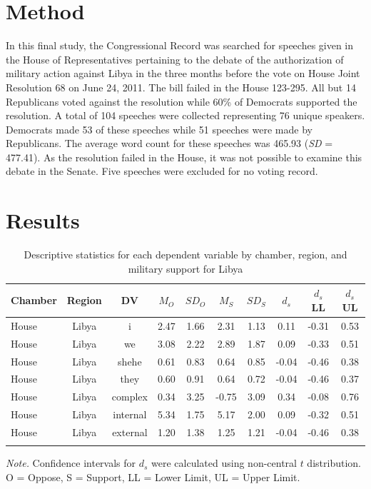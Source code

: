 \documentclass[english,,man,floatsintext]{apa6}
\begin{document}
\hypertarget{method-5}{%
\section{Method}\label{method-5}}

In this final study, the Congressional Record was searched for speeches given in the House of Representatives pertaining to the debate of the authorization of military action against Libya in the three months before the vote on House Joint Resolution 68 on June 24, 2011. The bill failed in the House 123-295. All but 14 Republicans voted against the resolution while 60\% of Democrats supported the resolution. A total of 104 speeches were collected representing 76 unique speakers. Democrats made 53 of these speeches while 51 speeches were made by Republicans. The average word count for these speeches was 465.93 (\emph{SD} = 477.41). As the resolution failed in the House, it was not possible to examine this debate in the Senate. Five speeches were excluded for no voting record.

\hypertarget{results-4}{%
\section{Results}\label{results-4}}

\begin{table}[tbp]
\begin{center}
\begin{threeparttable}
\caption{\label{tab:Ltable}Descriptive statistics for each dependent variable by chamber, 
          region, and military support for Libya}
\small{
\begin{tabular}{lccccccccc}
\toprule
Chamber & Region & DV & $M_O$ & $SD_O$ & $M_S$ & $SD_S$ & $d_s$ & $d_s$ LL & $d_s$ UL\\
\midrule
House & Libya & i & 2.47 & 1.66 & 2.31 & 1.13 & 0.11 & -0.31 & 0.53\\
House & Libya & we & 3.08 & 2.22 & 2.89 & 1.87 & 0.09 & -0.33 & 0.51\\
House & Libya & shehe & 0.61 & 0.83 & 0.64 & 0.85 & -0.04 & -0.46 & 0.38\\
House & Libya & they & 0.60 & 0.91 & 0.64 & 0.72 & -0.04 & -0.46 & 0.37\\
House & Libya & complex & 0.34 & 3.25 & -0.75 & 3.09 & 0.34 & -0.08 & 0.76\\
House & Libya & internal & 5.34 & 1.75 & 5.17 & 2.00 & 0.09 & -0.32 & 0.51\\
House & Libya & external & 1.20 & 1.38 & 1.25 & 1.21 & -0.04 & -0.46 & 0.38\\
\bottomrule
\addlinespace
\end{tabular}
}
\begin{tablenotes}[para]
\normalsize{\textit{Note.} Confidence intervals for $d_s$ were calculated using 
          non-central $t$ distribution. O = Oppose, S = Support, LL = Lower Limit, UL = Upper Limit.}
\end{tablenotes}
\end{threeparttable}
\end{center}
\end{table}
\end{document}
